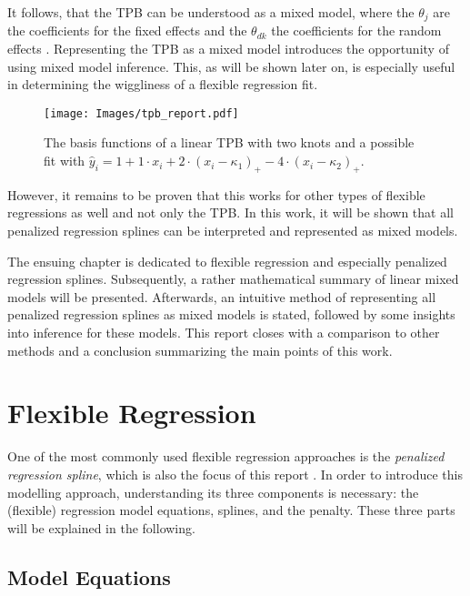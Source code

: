 \documentclass[12pt]{article}
\begin{document}
It follows, that the TPB can be understood as a mixed model, where the $\theta_j$ are the coefficients for the fixed effects and the $\theta_{dk}$ the coefficients for the random effects \cite{ruppert2003semiparametric}. Representing the TPB as a mixed model introduces the opportunity of using mixed model inference. This, as will be shown later on, is especially useful in determining the wiggliness of a flexible regression fit.

\begin{figure}
\begin{center}
\vspace{2em}
\texttt{[image: Images/tpb\_report.pdf]}
\end{center}
\vspace{-2em}
\caption[caption]{The basis functions of a linear TPB with two knots and a possible fit with $\hat{y}_i = 1 + 1 \cdot x_i +  2 \cdot(x_i{-}\kappa_1)_+ - 4\cdot (x_i{-}\kappa_2)_+.$}\label{tpb}
\end{figure}

However, it remains to be proven that this works for other types of flexible regressions as well and not only the TPB. 
In this work, it will be shown that all penalized regression splines can be interpreted and represented as mixed models. 

The ensuing chapter is dedicated to flexible regression and especially penalized regression splines. Subsequently, a rather mathematical summary of linear mixed models will be presented. Afterwards, an intuitive method of representing all penalized regression splines as mixed models is stated, followed by some insights into inference for these models. This report closes with a comparison to other methods and a conclusion summarizing the main points of this work.


\section{Flexible Regression}

One of the most commonly used flexible regression approaches is the \textit{penalized regression spline}, which is also the focus of this report \cite{fahrmeir2013regression, ruppert2003semiparametric, wood2017generalized}. In order to introduce this modelling approach, understanding its three components is necessary: the (flexible) regression model equations, splines, and the penalty. These three parts will be explained in the following.

\subsection{Model Equations}
\end{document}
